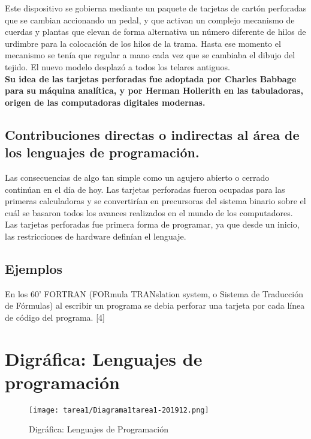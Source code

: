\documentclass{article}
\newenvironment{changemargin}[2]{%
\begin{list}{}{%
\setlength{\topsep}{0pt}%
\setlength{\leftmargin}{#1}%
\setlength{\rightmargin}{#2}%
\setlength{\listparindent}{\parindent}%
\setlength{\itemindent}{\parindent}%
\setlength{\parsep}{\parskip}%
}%
\item[]}{\end{list}}
\begin{document}
    Este dispositivo se gobierna mediante un paquete de tarjetas de cartón perforadas que se cambian accionando un pedal, y que activan un complejo mecanismo de cuerdas y plantas que elevan de forma alternativa un número diferente de hilos de urdimbre para la colocación de los hilos de la trama. Hasta ese momento el mecanismo se tenía que regular a mano cada vez que se cambiaba el dibujo del tejido. El nuevo modelo desplazó a todos los telares antiguos.\\
    
    \textbf{Su idea de las tarjetas perforadas fue adoptada por Charles Babbage para su máquina analítica, y por Herman Hollerith en las tabuladoras, origen de las computadoras digitales modernas.
    }
   \subsection{Contribuciones directas o indirectas al área de los lenguajes de programación.}
      
    Las consecuencias de algo tan simple como un agujero abierto o cerrado continúan en el día de hoy. Las tarjetas perforadas fueron ocupadas para las primeras calculadoras y se convertirían en precursoras del sistema binario sobre el cuál se basaron todos los avances realizados en el mundo de los computadores.\\
    
    Las tarjetas perforadas fue primera forma de programar, ya que desde un inicio, las restricciones de hardware definían el lenguaje. \\
    
    \subsection{Ejemplos}
    En los 60' FORTRAN (FORmula TRANslation system, o Sistema de Traducción de Fórmulas) al escribir un programa se debia perforar una tarjeta por cada línea de código del programa. [4]
   
\section{Digr\'afica: Lenguajes de programaci\'on}
\begin{changemargin}{0cm}{-20cm}
    \begin{landscape}
    
    \begin{figure}

    \texttt{[image: tarea1/Diagrama1tarea1-201912.png]}
    \caption{Digr\'afica: Lenguajes de Programaci\'on}
    \label{fig:universe}
    \end{figure}
\end{landscape} 
\end{changemargin} 
\end{document}
